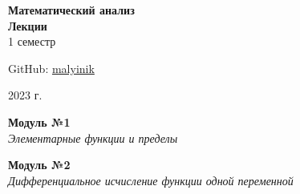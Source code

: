 


\begin{titlepage}
    \vspace*{0pt}
    \vfill
    \centering
    \Huge\textbf{Математический анализ} \\[7pt]
    \Large\textbf{Лекции} \\
    \large 1 семестр \\ 
    \vfill
    \begin{flushright}
        \normalsize GitHub: \href{https://github.com/malyinik}{malyinik} \\
    \end{flushright}
    \normalsize 2023 г.
\end{titlepage}
\newpage

\tableofcontents
\newpage

\begin{center}
\large{\textbf{Модуль №1} \\
\textit{Элементарные функции и пределы}}
\end{center}


\newpage
\zerocounter

\newpage
\zerocounter

\newpage
\zerocounter

\newpage
\zerocounter

\newpage
\zerocounter

\newpage
\zerocounter
\begin{center}
\large{\textbf{Модуль №2} \\
\textit{Дифференциальное исчисление функции одной переменной}}
\end{center}

\newpage
\zerocounter

\zerocounter
\newpage

\newpage
\zerocounter

\zerocounter
\newpage

\zerocounter
\newpage


